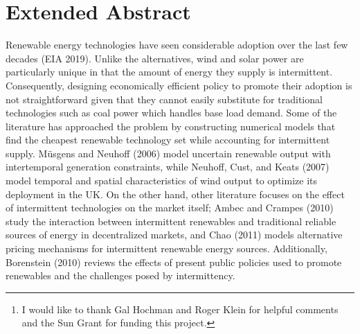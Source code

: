 \documentclass[11pt,a4paper]{extarticle}
\begin{document}
\title{}

\author[]{Saketh Aleti\thanks{I would like to thank Gal Hochman and Roger Klein for helpful comments and the Sun Grant for funding this project. }}


\date{\vspace{-1em}\small{\today}}

\maketitle

\section{Extended Abstract}

Renewable energy technologies have seen considerable adoption over the last few decades (EIA 2019). Unlike the alternatives, wind and solar power are particularly unique in that the amount of energy they supply is intermittent. Consequently, designing economically efficient policy to promote their adoption is not straightforward given that they cannot easily substitute for traditional technologies such as coal power which handles base load demand. Some of the literature has approached the problem by constructing numerical models that find the cheapest renewable technology set while accounting for intermittent supply. Müsgens and Neuhoff (2006) model uncertain renewable output with intertemporal generation constraints, while Neuhoff, Cust, and Keats (2007) model temporal and spatial characteristics of wind output to optimize its deployment in the UK. On the other hand, other literature focuses on the effect of intermittent technologies on the market itself; Ambec and Crampes (2010) study the interaction between intermittent renewables and traditional reliable sources of energy in decentralized markets, and Chao (2011) models alternative pricing mechanisms for intermittent renewable energy sources. Additionally, Borenstein (2010) reviews the effects of present public policies used to promote renewables and the challenges posed by intermittency. 
\end{document}
